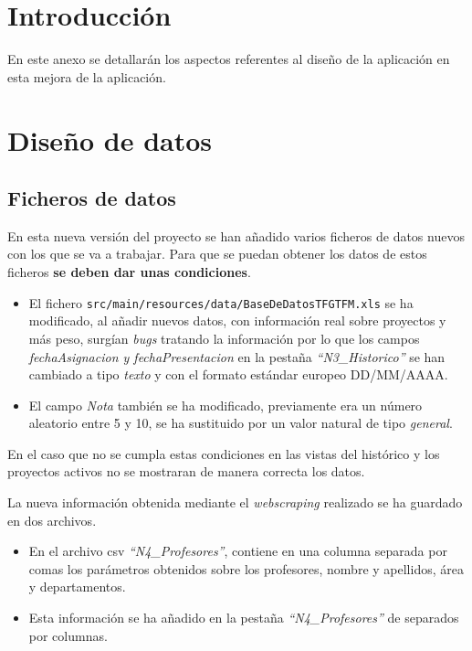 
\section{Introducción}
En este anexo se detallarán los aspectos referentes al diseño de la aplicación en esta mejora de la aplicación.

\section{Diseño de datos}

\subsection{Ficheros de datos}

En esta nueva versión del proyecto se han añadido varios ficheros de datos nuevos con los que se va a trabajar. Para que se puedan obtener los datos de estos ficheros \textbf{se deben dar unas condiciones}.

\begin{itemize}
	\item El fichero \texttt{src/main/resources/data/BaseDeDatosTFGTFM.xls} se ha modificado, al añadir nuevos datos, con información real sobre proyectos y más peso, surgían \emph{bugs} tratando la información por lo que los campos \emph{fechaAsignacion y fechaPresentacion} en la pestaña \emph{``N3\_Historico''} se han cambiado a tipo \emph{texto} y con el formato estándar europeo DD/MM/AAAA.
	\item El campo \emph{Nota} también se ha modificado, previamente era un número aleatorio entre 5 y 10, se ha sustituido por un valor natural de tipo \emph{general}.
\end{itemize}

En el caso que no se cumpla estas condiciones en las vistas del histórico
y los proyectos activos no se mostraran de manera correcta los datos.

La nueva información obtenida mediante el \emph{webscraping} realizado se ha guardado en dos archivos.
\begin{itemize}
	\item En el archivo csv \emph{``N4\_Profesores''}, contiene en una columna separada por comas los parámetros obtenidos sobre los profesores, nombre y apellidos, área y departamentos.
	\item Esta información se ha añadido en la pestaña \emph{``N4\_Profesores''} de separados por columnas.
\end{itemize}

